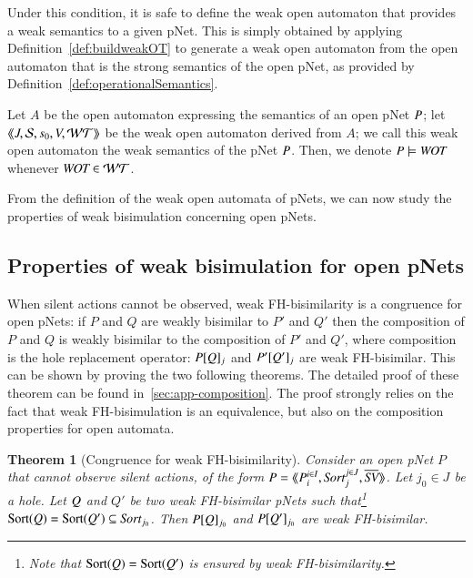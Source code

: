 \documentclass{elsarticle}
\newcommand{\TODO}[1]{\textcolor{red}{\textbf{[TODO:#1]}}}
\newtheorem{thm}{Theorem}
\begin{document}

Under this condition, it is safe to define the weak open automaton that provides a weak semantics to a given pNet. This is simply obtained by applying Definition~\ref{def:buildweakOT} to generate a weak open automaton from the open automaton that is the strong semantics of the open pNet, as provided by Definition~\ref{def:operationalSemantics}.

\begin{definition}
Let $A$ be the open automaton expressing the semantics of an open pNet $P$; let $\langle\hspace{-0.45ex}\langle J,\mathcal{S},s_0, V, \mathcal{WT}\rangle\hspace{-0.45ex}\rangle$ be the weak open automaton derived from $A$; we call this weak open automaton the weak semantics of the pNet $P$. Then, we denote $\pNet \models \WOT$ whenever $\WOT\in\WT$.
\end{definition}

From the definition of the weak open automata of pNets, we can now study the properties of weak bisimulation concerning open pNets.


\subsection{Properties of weak bisimulation for open pNets}

When silent actions cannot be observed, weak FH-bisimilarity is a congruence for open pNets: if $P$ and $Q$ are weakly bisimilar to $P'$ and $Q'$ then the composition of $P$ and $Q$ is weakly bisimilar to the composition of $P'$ and $Q'$, where composition is the hole replacement operator: 	$P[Q]_{j}$ and 
	$P'[Q']_{j}$ are weak FH-bisimilar. This can be shown by proving the two following theorems.
The detailed proof of these theorem can be found in~\ref{sec:app-composition}. The proof strongly relies on the fact that weak FH-bisimulation is an equivalence, but also on the composition properties for open automata.

\begin{thm}[Congruence for  weak FH-bisimilarity]\label{weak-thm-congr-eq}
	Consider an open pNet $P$
 that cannot observe silent actions, of the form 	$\pNet = \mylangle \pNet_i^{i\in I}, \Sort_j^{j\in J}, 
	\set{\symb{SV}}\myrangle$.
	Let $j_0\in J$ be a hole. Let $Q$ and $Q'$ be two weak FH-bisimilar pNets such that\footnote{Note that $\operatorname{Sort}(Q)=\operatorname{Sort}(Q')$ is 
	ensured by 
	weak FH-bisimilarity.} 
	$\Sortop(\pNetQ)=\Sortop(\pNetQ')\subseteq\Sort_{j_0}$. Then 
	$P[Q]_{j_0}$ and 
	$P[Q']_{j_0}$ are weak FH-bisimilar.
\end{thm}
\end{document}
